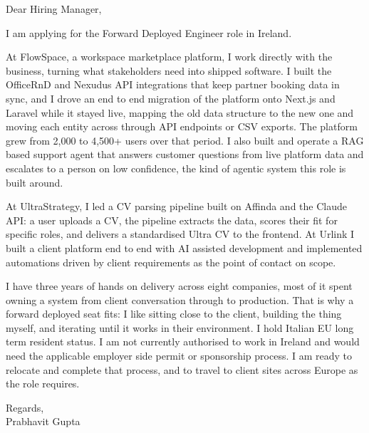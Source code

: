 \documentclass[a4paper,11pt]{article}
\begin{document}
Dear Hiring Manager,

I am applying for the Forward Deployed Engineer role in Ireland.

At FlowSpace, a workspace marketplace platform, I work directly with the business, turning what stakeholders need into shipped software. I built the OfficeRnD and Nexudus API integrations that keep partner booking data in sync, and I drove an end to end migration of the platform onto Next.js and Laravel while it stayed live, mapping the old data structure to the new one and moving each entity across through API endpoints or CSV exports. The platform grew from 2,000 to 4,500+ users over that period. I also built and operate a RAG based support agent that answers customer questions from live platform data and escalates to a person on low confidence, the kind of agentic system this role is built around.

At UltraStrategy, I led a CV parsing pipeline built on Affinda and the Claude API: a user uploads a CV, the pipeline extracts the data, scores their fit for specific roles, and delivers a standardised Ultra CV to the frontend. At Urlink I built a client platform end to end with AI assisted development and implemented automations driven by client requirements as the point of contact on scope.

I have three years of hands on delivery across eight companies, most of it spent owning a system from client conversation through to production. That is why a forward deployed seat fits: I like sitting close to the client, building the thing myself, and iterating until it works in their environment. I hold Italian EU long term resident status. I am not currently authorised to work in Ireland and would need the applicable employer side permit or sponsorship process. I am ready to relocate and complete that process, and to travel to client sites across Europe as the role requires.

Regards,\\
Prabhavit Gupta
\end{document}
